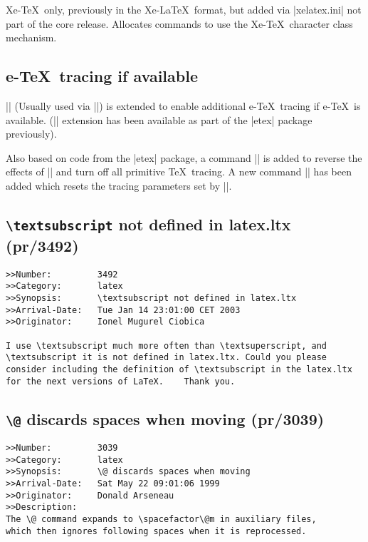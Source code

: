 \documentclass{ltxguide}
\newcommand\DescribeMacro[1]{\texttt{\string#1}}
\begin{document}
\DescribeMacro{\newXeTeXintercharclass}
\smallskip

Xe-\TeX\ only, previously in the Xe-\LaTeX\ format, but added via
|xelatex.ini| not part of the core release.
Allocates commands to use the Xe-\TeX\ character class mechanism.


\subsection{e-\TeX\ tracing if available}
|\loggingall| (Usually used via |\tracingall|) is extended to enable
additional e-\TeX\ tracing if e-\TeX\ is available. (|\tracingall|
extension has been available as part of the |etex| package previously).

Also based on code from the |etex| package, a command |\tracingnone|
is added to reverse the effects of |\tracingall| and turn off all primitive
\TeX\ tracing. A new command |\hideoutput| has been  added which resets the
tracing parameters set by |\showoutput|.




\subsection{\texttt{\textbackslash textsubscript} not defined in
   latex.ltx (pr/3492)}

\begin{verbatim}
>>Number:         3492
>>Category:       latex
>>Synopsis:       \textsubscript not defined in latex.ltx
>>Arrival-Date:   Tue Jan 14 23:01:00 CET 2003
>>Originator:     Ionel Mugurel Ciobica

I use \textsubscript much more often than \textsuperscript, and
\textsubscript it is not defined in latex.ltx. Could you please
consider including the definition of \textsubscript in the latex.ltx
for the next versions of LaTeX.    Thank you.
\end{verbatim}

\subsection{\texttt{\textbackslash @} discards spaces when moving
            (pr/3039)}

\begin{verbatim}
>>Number:         3039
>>Category:       latex
>>Synopsis:       \@ discards spaces when moving
>>Arrival-Date:   Sat May 22 09:01:06 1999
>>Originator:     Donald Arseneau
>>Description:
The \@ command expands to \spacefactor\@m in auxiliary files,
which then ignores following spaces when it is reprocessed.
\end{verbatim}
\end{document}

